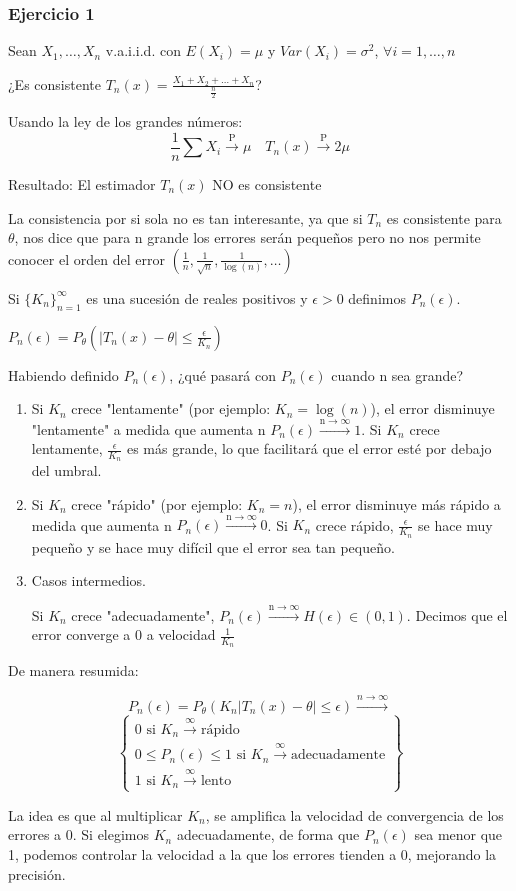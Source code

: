 \subsubsection*{Ejercicio 1}
Sean $X_1, \dots, X_n$ v.a.i.i.d. con $E(X_i)=\mu$ y $Var(X_i)=\sigma^2$, $\forall i=1, \dots, n$

¿Es consistente $T_n(x) = \frac{X_1 + X_2 + \dots + X_n}{\frac{n}{2}}$?

Usando la ley de los grandes números:
\[
    \frac{1}{n}\sum X_i \xrightarrow{\text{P}} \mu \quad T_n(x)\xrightarrow{\text{P}}2\mu
\]

Resultado: El estimador $T_n(x)$ NO es consistente

\newpage

La consistencia por si sola no es tan interesante, ya que si $T_n$ es consistente para $\theta$, nos dice que para n grande los errores serán pequeños pero no nos permite conocer el orden del error $\left(\frac{1}{n}, \frac{1}{\sqrt{n}},\frac{1}{\log(n)}, \dots\right)$

Si $\{K_n\}_{n=1}^{\infty}$ es una sucesión de reales positivos y $\epsilon>0$ definimos $P_n(\epsilon)$.

$P_n(\epsilon)=P_\theta(|T_n(x)-\theta| \leq \frac{\epsilon}{K_n})$

Habiendo definido $P_n(\epsilon)$, ¿qué pasará con  $P_n(\epsilon)$ cuando n sea grande?
\begin{enumerate}
    \item Si $K_n$ crece "lentamente" (por ejemplo:  $K_n=\log(n)$), el error disminuye "lentamente" a medida que aumenta n $P_n(\epsilon) \xrightarrow{{\text{n} \to \infty}} 1$. Si $K_n$ crece lentamente, $ \frac{\epsilon}{K_n}$ es más grande, lo que facilitará que el error esté por debajo del umbral.
    \item Si $K_n$ crece "rápido" (por ejemplo:  $K_n=n$), el error disminuye más rápido a medida que aumenta n $P_n(\epsilon) \xrightarrow{{\text{n} \to \infty}} 0$.  Si $K_n$ crece rápido, $ \frac{\epsilon}{K_n}$ se hace muy pequeño y se hace muy difícil que el error sea tan pequeño.
    \item Casos intermedios.

          Si $K_n$ crece "adecuadamente", $P_n(\epsilon) \xrightarrow{{\text{n} \to \infty}} H(\epsilon) \in (0,1)$. Decimos que el error converge a 0 a velocidad $\frac{1}{K_n}$
\end{enumerate}
De manera resumida:

\[
    P_n(\epsilon) = P_\theta(K_n|T_n(x) - \theta| \leq \epsilon) \xrightarrow{n \to \infty}
\]
\[
    \begin{Bmatrix}
        0 \text{ si } K_n \xrightarrow{\infty} \text{rápido}                                  \\
        0 \leq P_n(\epsilon) \leq 1 \text{ si } K_n \xrightarrow{\infty} \text{adecuadamente} \\
        1 \text{ si } K_n \xrightarrow{\infty} \text{lento}
    \end{Bmatrix}
\]

La idea es que al multiplicar $K_n$, se amplifica la velocidad de convergencia de los errores a 0. Si elegimos $K_n$ adecuadamente, de forma que $P_n(\epsilon)$ sea menor que 1, podemos controlar la velocidad a la que los errores tienden a 0, mejorando la precisión.
